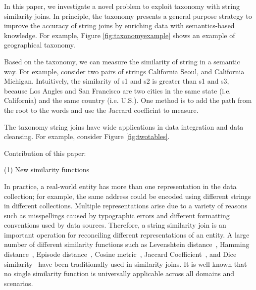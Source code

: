 In this paper, we investigate a novel problem to exploit taxonomy with string similarity joins. In principle, the taxonomy presents a general purpose strategy to improve the accuracy of string joins by enriching data with semantics-based knowledge. For example, Figure \ref{fig:taxonomyexample} shows an example of geographical taxonomy.

Based on the taxonomy, we can measure the similarity of string in a semantic way. For example, consider two pairs of strings California Seoul, and California Michigan. Intuitively, the similarity of s1 and s2 is greater than s1 and s3, because Los Angles and San Francisco are two cities in the same state (i.e. California) and the same country (i.e. U.S.). One method is to add the path from the root to the words and use the Jaccard coefficint to measure. 

The taxonomy string joins have wide applications in data integration and data cleansing. For example, consider Figure \ref{fig:twotables}.

Contribution of this paper:

(1) New similarity functions





 In practice, a real-world entity has more than one representation in the data
collection; for example, the same address could be encoded using
different strings in different collections. Multiple representations
arise due to a variety of reasons such as misspellings
caused by typographic errors and different formatting conventions
used by data sources. Therefore, a string similarity join is an important operation for reconciling different
representations of an entity. A large number of different similarity functions such as Levenshtein distance~\cite{conf/sigmod/WangLF12},
Hamming distance~\cite{conf/spire/Kondrak05}, Episode
distance~\cite{conf/ijcai/CohenRF03}, Cosine
metric~\cite{journals/ipm/SaltonB88}, Jaccard
Coefficient~\cite{conf/icde/ChaudhuriGK06,conf/icde/LiLL08}, and Dice
similarity~\cite{conf/www/BayardoMS07} have been traditionally used in similarity joins. It is well known
that no single similarity function is universally applicable
across all domains and scenarios.




